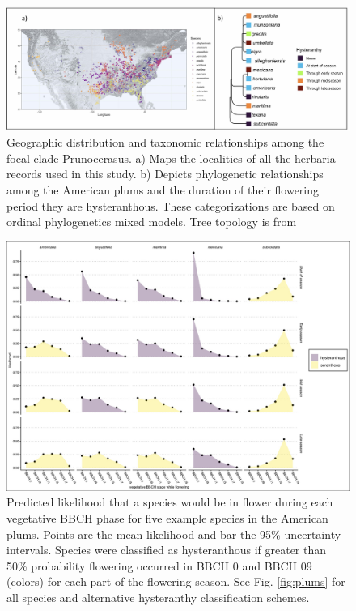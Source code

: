 \documentclass{article}[11pt]
\begin{document}
\begin{figure}[h!]
  \centering
 \includegraphics[width=\textwidth]{..//..//Plots/fig1_new.jpg}
    \caption{Geographic distribution and taxonomic relationships among the focal clade Prunocerasus. a) Maps the localities of all the herbaria records used in this study. b) Depicts phylogenetic relationships among the American plums and the duration of their flowering period they are hysteranthous. These categorizations are based on ordinal phylogenetics mixed models. Tree topology is from \citet{Shaw:2004aa}}
    \label{fig:phylo2}
\end{figure}



\begin{figure}[h!]
    \centering
 \includegraphics[width=\textwidth]{..//..//Plots/ord_quants_exmpsps.jpeg}
    \caption{Predicted likelihood that a species would be in flower during each vegetative BBCH phase for five example species in the American plums. Points are the mean likelihood and bar the 95\% uncertainty intervals. Species were classified as hysteranthous if greater than 50\% probability flowering occurred in BBCH 0 and BBCH 09 (colors) for each part of the flowering season.
  See Fig. \ref{fig:plums} for all species and alternative hysteranthy classification schemes. }
    \label{fig:ordinals}
\end{figure}
\end{document}
